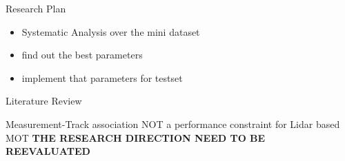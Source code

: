 \documentclass[aspectratio=169,xcolor=dvipsnames]{beamer}
\begin{document}
\begin{frame}{Research Plan}
    \begin{itemize}
        \item{Systematic Analysis over the mini dataset}
        \item{find out the best parameters}
        \item{implement that parameters for testset}
    \end{itemize}
\end{frame}

\begin{frame}{Literature Review}
\begin{block}{Measurement-Track association NOT a performance constraint for Lidar based MOT}
    \textbf{THE RESEARCH DIRECTION NEED TO BE REEVALUATED}
\end{block}
\end{frame}
\end{document}
